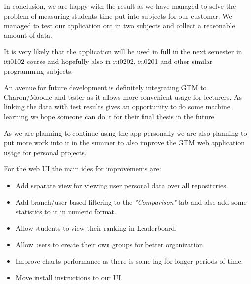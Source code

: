 In conclusion, we are happy with the result as we have managed to solve the problem of measuring students time
put into subjects for our customer.
We managed to test our application out in two subjects and collect a reasonable amount of data.

It is very likely that the application will be used in full in the next semester in iti0102 course and hopefully also in
iti0202, iti0201 and other similar programming subjects.

An avenue for future development is definitely integrating GTM to Charon/Moodle and tester as it allows more convenient usage for lecturers.
As linking the data with test results gives an opportunity to do some machine learning we hope someone can do it for their final thesis in the future.

As we are planning to continue using the app personally we are also planning to put more work into it in the summer to
also improve the GTM web application usage for personal projects.

For the web UI the main ides for improvements are:
\begin{itemize}
    \item Add separate view for viewing user personal data over all repositories.
    \item Add branch/user-based filtering to the \textit{"Comparison"} tab and also add some statistics to it in numeric format.
    \item Allow students to view their ranking in Leaderboard.
    \item Allow users to create their own groups for better organization.
    \item Improve charts performance as there is some lag for longer periods of time.
    \item Move install instructions to our UI.
\end{itemize}

